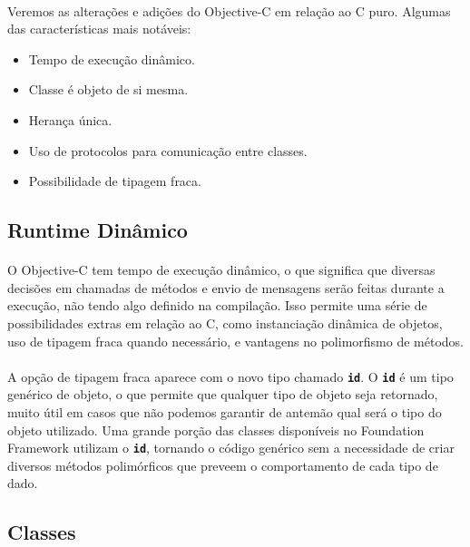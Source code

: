 \documentclass[a4paper,12pt,brazil,doubleside]{book}
\begin{document}
\paragraph{}Veremos as alterações e adições do Objective-C em relação ao C puro. Algumas das características mais notáveis:

\begin{itemize}
\item Tempo de execução dinâmico.
\item Classe é objeto de si mesma.
\item Herança única.
\item Uso de protocolos para comunicação entre classes.
\item Possibilidade de tipagem fraca.
\end{itemize}

\bigskip 
\bigskip

\subsection{Runtime Dinâmico}

\paragraph{}O Objective-C tem tempo de execução dinâmico, o que significa que diversas decisões em chamadas de métodos e envio de mensagens serão feitas durante a execução, não tendo algo definido na compilação. Isso permite uma série de possibilidades extras em relação ao C, como instanciação dinâmica de objetos, uso de tipagem fraca quando necessário, e vantagens no polimorfismo de métodos.
\paragraph{}A opção de tipagem fraca aparece com o novo tipo chamado \texttt{\textbf{id}}. O \texttt{\textbf{id}} é um tipo genérico de objeto, o que permite que qualquer tipo de objeto seja retornado, muito útil em casos que não podemos garantir de antemão qual será o tipo do objeto utilizado. Uma grande porção das classes disponíveis no Foundation Framework utilizam o \texttt{\textbf{id}}, tornando o código genérico sem a necessidade de criar diversos métodos polimórficos que preveem o comportamento de cada tipo de dado.

\bigskip 

\subsection{Classes}
\end{document}
